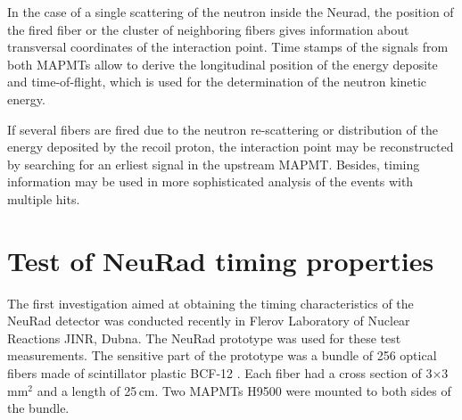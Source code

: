 \documentclass{webofc}
\begin{document}
In the case of a single scattering of the neutron inside the Neurad, the position of the fired fiber or the cluster of neighboring fibers gives information about transversal coordinates of the interaction point. Time stamps of the signals from both MAPMTs allow to derive the longitudinal position of the energy deposite and time-of-flight, which is used for the determination of the neutron kinetic energy. 

If several  fibers are fired due to the neutron re-scattering or distribution of the energy deposited by the recoil proton, the interaction point may be reconstructed by searching for an erliest signal in the upstream MAPMT. Besides, timing information may be used in more sophisticated analysis of the events with multiple hits.


\section{Test of NeuRad timing properties}

The first investigation aimed at obtaining the timing characteristics of the NeuRad detector was conducted recently in Flerov Laboratory of Nuclear Reactions JINR, Dubna. The NeuRad prototype was used for these test measurements. The sensitive part of the prototype was a bundle of 256 optical fibers made of scintillator plastic BCF-12 \cite{crystals}. 
Each fiber had a cross section of 3$\times$3\,mm$^2$ and a length of 25\,cm. Two MAPMTs H9500 \cite{hm} were mounted to both sides of the bundle.
\end{document}
